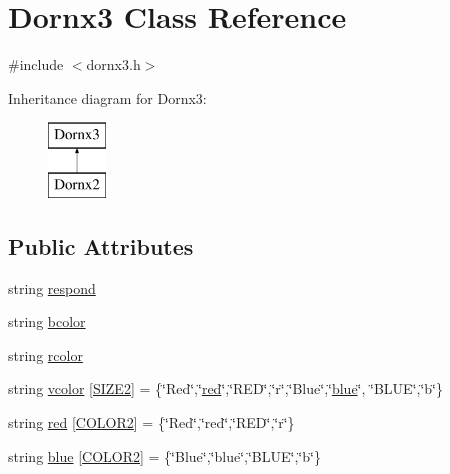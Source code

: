 \hypertarget{class_dornx3}{}\section{Dornx3 Class Reference}
\label{class_dornx3}


{\ttfamily \#include $<$dornx3.\+h$>$}

Inheritance diagram for Dornx3\+:\begin{figure}[H]
\begin{center}
\leavevmode
\includegraphics[height=2.000000cm]{class_dornx3}
\end{center}
\end{figure}
\subsection*{Public Attributes}
\begin{DoxyCompactItemize}
\item 
string \hyperlink{class_dornx3_aa8cbadbae14b2e9a29e38ba9b0ed37ba}{respond}
\item 
string \hyperlink{class_dornx3_ab2a8fd3713629e06177cf91b7221b82b}{bcolor}
\item 
string \hyperlink{class_dornx3_afb914249485c727f99503ac24e5b444f}{rcolor}
\item 
string \hyperlink{class_dornx3_a23ed936890f7aac31561df8819a5bb2e}{vcolor} \mbox{[}\hyperlink{dornx3_8h_abbca5f70b1b16867a3fd2f340a1fbdd9}{S\+I\+Z\+E2}\mbox{]} = \{\char`\"{}Red\char`\"{},\char`\"{}\hyperlink{class_dornx3_a556c86898a12bc10ff4a559d822cea1a}{red}\char`\"{},\char`\"{}R\+ED\char`\"{},\char`\"{}r\char`\"{},\char`\"{}Blue\char`\"{},\char`\"{}\hyperlink{class_dornx3_ad4294dbbc1608b76c5e49736b3bb8a86}{blue}\char`\"{}, \char`\"{}B\+L\+UE\char`\"{},\char`\"{}b\char`\"{}\}
\item 
string \hyperlink{class_dornx3_a556c86898a12bc10ff4a559d822cea1a}{red} \mbox{[}\hyperlink{dornx3_8h_afd1642892fe952b92046b3b290301c66}{C\+O\+L\+O\+R2}\mbox{]} = \{\char`\"{}Red\char`\"{},\char`\"{}red\char`\"{},\char`\"{}R\+ED\char`\"{},\char`\"{}r\char`\"{}\}
\item 
string \hyperlink{class_dornx3_ad4294dbbc1608b76c5e49736b3bb8a86}{blue} \mbox{[}\hyperlink{dornx3_8h_afd1642892fe952b92046b3b290301c66}{C\+O\+L\+O\+R2}\mbox{]} = \{\char`\"{}Blue\char`\"{},\char`\"{}blue\char`\"{},\char`\"{}B\+L\+UE\char`\"{},\char`\"{}b\char`\"{}\}
\end{DoxyCompactItemize}


